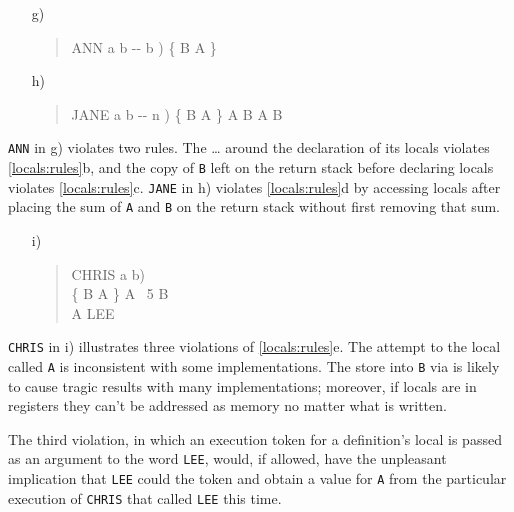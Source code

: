 \begin{enumerate}
\item[g)] \begin{quote}\ttfamily
	\word{:} ANN  a b -{}- b )
		   
		\{ B A \}   \word{;}
	\end{quote}

\item[h)] \begin{quote}\ttfamily
	\word{:} JANE  a b -{}- n )
		\{ B A \} A B \word{+}  A B \word{-} ~ \word{/} \word{;}
	\end{quote}
\end{enumerate}

\texttt{ANN} in g) violates two rules. The  {\ldots} 
around the declaration of its locals violates \ref{locals:rules}b, and
the copy of \texttt{B} left on the return stack before declaring locals
violates \ref{locals:rules}c. \texttt{JANE} in h) violates
\ref{locals:rules}d by accessing locals after placing the sum of
\texttt{A} and \texttt{B} on the return stack without first removing
that sum.

\begin{enumerate}
\item[i)] \begin{quote}\ttfamily
	\word{:} CHRIS  a b) \\
	\tab \{ B A \} \word{[']} A 
		~5 \word{[']} B  \word{!} \\
	\tab[0.45] \word{[}  A \word{]}  LEE
	\word{;}
	\end{quote}
\end{enumerate}

\texttt{CHRIS} in i) illustrates three violations of
\ref{locals:rules}e. The attempt to  the local called
\texttt{A} is inconsistent with some implementations. The store into
\texttt{B} via  is likely to cause tragic results with
many implementations; moreover, if locals are in registers they can't
be addressed as memory no matter what is written.

The third violation, in which an execution token for a definition's
local is passed as an argument to the word \texttt{LEE}, would, if
allowed, have the unpleasant implication that \texttt{LEE} could
 the token and obtain a value for \texttt{A} from the
particular execution of \texttt{CHRIS} that called \texttt{LEE} this
time.

